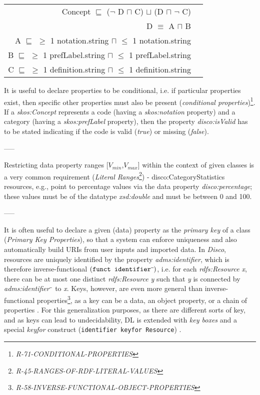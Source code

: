 \documentclass{llncs}
\newcommand{\ms}[1]{\texttt{#1}}
\newenvironment{DL}{
  \vspace{0cm}
  \begin{tabular}{r l}

}{
  \end{tabular}
}
\begin{document}
\begin{DL}
Concept $\sqsubseteq$ ($\neg$ D $\sqcap$ C) $\sqcup$ (D $\sqcap$ $\neg$ C) \\ 
D $\equiv$ A $\sqcap$ B \\
A $\sqsubseteq$ $\geq$ 1 notation.string $\sqcap$ $\leq$ 1 notation.string \\
B $\sqsubseteq$ $\geq$ 1 prefLabel.string $\sqcap$ $\leq$ 1 prefLabel.string \\
C $\sqsubseteq$ $\geq$ 1 definition.string $\sqcap$ $\leq$ 1 definition.string \\
\end{DL}

It is useful to declare properties to be conditional, i.e. if particular properties exist, then specific other properties must also be present (\emph{conditional properties})\footnote{{\em R-71-CONDITIONAL-PROPERTIES}\label{R-71-CONDITIONAL-PROPERTIES}}.
If a {\em skos:Concept} represents a code (having a {\em skos:notation} property) and a category (having a {\em skos:prefLabel} property), 
then the property {\em disco:isValid} has to be stated indicating if the code is valid (\emph{true}) or missing (\emph{false}).

-----

Restricting data property ranges [$V_{min}$,$V_{max}$] within the context of given classes is a very common requirement (\emph{Literal Ranges}\footnote{\emph{R-45-RANGES-OF-RDF-LITERAL-VALUES}}) 
- disco:CategoryStatistics resources, e.g., point to percentage values via the data property \emph{disco:percentage}; 
these values must be of the datatype \emph{xsd:double} and must be between 0 and 100.

-----

It is often useful to declare a given (data) property as the \emph{primary key} of a class (\emph{Primary Key Properties}), so that a system can enforce uniqueness and also automatically build URIs from user inputs and imported data. 
In \emph{Disco}, resources are uniquely identified by the property \emph{adms:identifier},
which is therefore inverse-functional
$(\ms{funct identifier}\sp{\overline{\ }})$,
i.e. for each \emph{rdfs:Resource x}, there can be at most one distinct \emph{rdfs:Resource y} such that \emph{y} is connected by \emph{adms:identifier$\sp{\overline{\ }}$} to \emph{x}.
Keys, however, are even more general than inverse-functional properties\footnote{\emph{R-58-INVERSE-FUNCTIONAL-OBJECT-PROPERTIES}},
as a key can be a data, an object property, or a chain of properties \cite{Schneider2009}.
For this generalization purposes, as there are different sorts of key, and as keys can lead to undecidability, 
DL is extended with \emph{key boxes} and a special \emph{keyfor} construct (\ms{identifier \ms{keyfor} Resource}) \cite{Lutz2005}.
\end{document}
